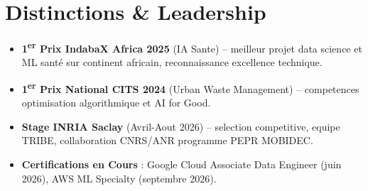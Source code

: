 \documentclass[a4paper,11pt]{article}
\begin{document}
\section{Distinctions \& Leadership}
\begin{itemize}[leftmargin=*, label=\tiny$\bullet$, nosep]
    \item \small{\textbf{1\textsuperscript{er} Prix IndabaX Africa 2025} (IA Sante) -- meilleur projet data science et ML santé sur continent africain, reconnaissance excellence technique.}
    \item \small{\textbf{1\textsuperscript{er} Prix National CITS 2024} (Urban Waste Management) -- competences optimisation algorithmique et AI for Good.}
    \item \small{\textbf{Stage INRIA Saclay} (Avril-Aout 2026) -- selection competitive, equipe TRIBE, collaboration CNRS/ANR programme PEPR MOBIDEC.}
    \item \small{\textbf{Certifications en Cours} : Google Cloud Associate Data Engineer (juin 2026), AWS ML Specialty (septembre 2026).}
\end{itemize}
\end{document}
